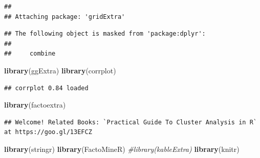 \documentclass[]{article}
\newenvironment{Shaded}{\begin{snugshade}}{\end{snugshade}}
\newcommand{\KeywordTok}[1]{\textcolor[rgb]{0.13,0.29,0.53}{\textbf{#1}}}
\newcommand{\DecValTok}[1]{\textcolor[rgb]{0.00,0.00,0.81}{#1}}
\newcommand{\StringTok}[1]{\textcolor[rgb]{0.31,0.60,0.02}{#1}}
\newcommand{\CommentTok}[1]{\textcolor[rgb]{0.56,0.35,0.01}{\textit{#1}}}
\newcommand{\OtherTok}[1]{\textcolor[rgb]{0.56,0.35,0.01}{#1}}
\newcommand{\OperatorTok}[1]{\textcolor[rgb]{0.81,0.36,0.00}{\textbf{#1}}}
\newcommand{\NormalTok}[1]{#1}
\begin{document}
\begin{verbatim}
## 
## Attaching package: 'gridExtra'
\end{verbatim}

\begin{verbatim}
## The following object is masked from 'package:dplyr':
## 
##     combine
\end{verbatim}

\begin{Shaded}
\begin{Highlighting}[]
\KeywordTok{library}\NormalTok{(ggExtra)}
\KeywordTok{library}\NormalTok{(corrplot)}
\end{Highlighting}
\end{Shaded}

\begin{verbatim}
## corrplot 0.84 loaded
\end{verbatim}

\begin{Shaded}
\begin{Highlighting}[]
\KeywordTok{library}\NormalTok{(factoextra)}
\end{Highlighting}
\end{Shaded}

\begin{verbatim}
## Welcome! Related Books: `Practical Guide To Cluster Analysis in R` at https://goo.gl/13EFCZ
\end{verbatim}

\begin{Shaded}
\begin{Highlighting}[]
\KeywordTok{library}\NormalTok{(stringr)}
\KeywordTok{library}\NormalTok{(FactoMineR)}
\CommentTok{#library(kableExtra)}
\KeywordTok{library}\NormalTok{(knitr)}
\end{Highlighting}
\end{Shaded}

\begin{Shaded}
\end{Shaded}
\end{document}
